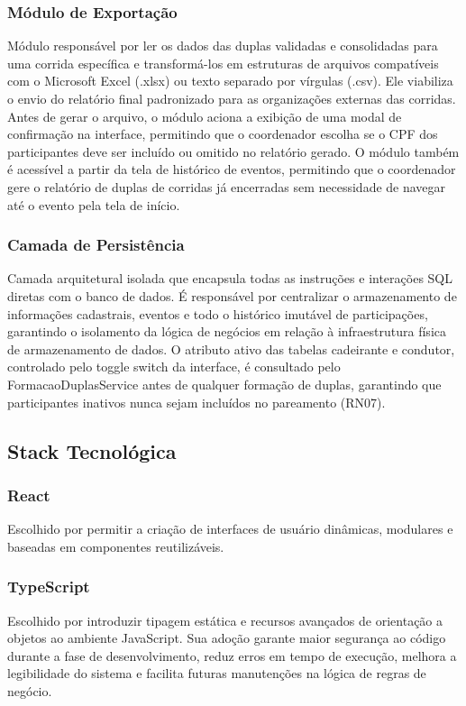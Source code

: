 \documentclass[12pt,a4paper]{article}
\begin{document}
\subsubsection{Módulo de Exportação}
Módulo responsável por ler os dados das duplas validadas e consolidadas para uma corrida específica e transformá-los em estruturas de arquivos compatíveis com o Microsoft Excel (.xlsx) ou texto separado por vírgulas (.csv). Ele viabiliza o envio do relatório final padronizado para as organizações externas das corridas. Antes de gerar o arquivo, o módulo aciona a exibição de uma modal de confirmação na interface, permitindo que o coordenador escolha se o CPF dos participantes deve ser incluído ou omitido no relatório gerado. O módulo também é acessível a partir da tela de histórico de eventos, permitindo que o coordenador gere o relatório de duplas de corridas já encerradas sem necessidade de navegar até o evento pela tela de início.

\subsubsection{Camada de Persistência}
Camada arquitetural isolada que encapsula todas as instruções e interações SQL diretas com o banco de dados. É responsável por centralizar o armazenamento de informações cadastrais, eventos e todo o histórico imutável de participações, garantindo o isolamento da lógica de negócios em relação à infraestrutura física de armazenamento de dados. O atributo ativo das tabelas cadeirante e condutor, controlado pelo toggle switch da interface, é consultado pelo FormacaoDuplasService antes de qualquer formação de duplas, garantindo que participantes inativos nunca sejam incluídos no pareamento (RN07).

\subsection{Stack Tecnológica}

\subsubsection{React}
Escolhido por permitir a criação de interfaces de usuário dinâmicas, modulares e baseadas em componentes reutilizáveis.

\subsubsection{TypeScript}
Escolhido por introduzir tipagem estática e recursos avançados de orientação a objetos ao ambiente JavaScript. Sua adoção garante maior segurança ao código durante a fase de desenvolvimento, reduz erros em tempo de execução, melhora a legibilidade do sistema e facilita futuras manutenções na lógica de regras de negócio.
\end{document}
